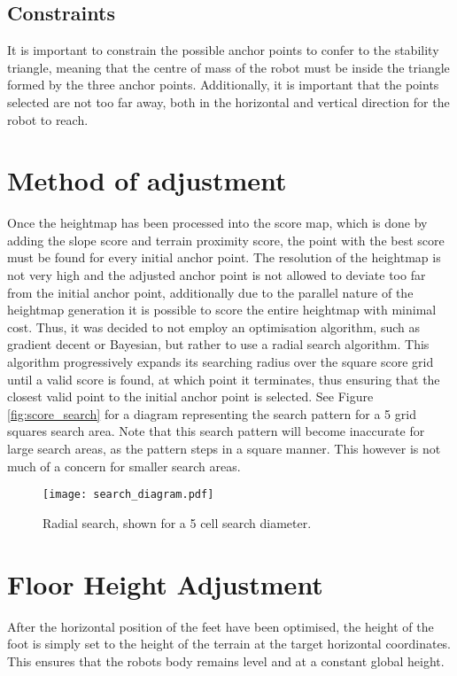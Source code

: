     \subsection{Constraints}
    It is important to constrain the possible anchor points to confer to the stability triangle,
    meaning that the centre of mass of the robot must be inside the triangle formed by the three
    anchor points. Additionally, it is important that the points selected are not too far away,
    both in the horizontal and vertical direction for the robot to reach.


\section{Method of adjustment} \label{sec:radial_search}
    Once the heightmap has been processed into the score map, which is done by adding the
    slope score and terrain proximity score, the point with the best score must be found for every
    initial anchor point.
    The resolution of the heightmap is not very high and the adjusted anchor point is not
    allowed to deviate too far from the initial anchor point, additionally due to the parallel nature
    of the heightmap generation it is possible to score the entire heightmap with minimal cost.
    Thus, it was decided to not employ an optimisation algorithm, such as gradient decent or
    Bayesian, but rather to use a radial search algorithm. This algorithm progressively expands
    its searching radius over the square score grid until a valid score is found, at which point it
    terminates, thus ensuring that the closest valid point to the initial anchor point is selected.
    See Figure \ref{fig:score_search} for a diagram representing the search pattern for a 5 grid squares search area.
    Note that this search pattern will become inaccurate for large search areas, as the pattern steps
    in a square manner. This however is not much of a concern for smaller search areas.

    \begin{figure}[h]
        \centering
        \texttt{[image: search\_diagram.pdf]}
        \caption{Radial search, shown for a 5 cell search diameter.}
        \label{fig:radial_search}
    \end{figure}

    \section{Floor Height Adjustment} \label{sec:height_adjust}
    After the horizontal position of the feet have been optimised, the height of the foot is simply set to the height of the
    terrain at the target horizontal coordinates. This ensures that the robots body remains level and at a constant global height.

